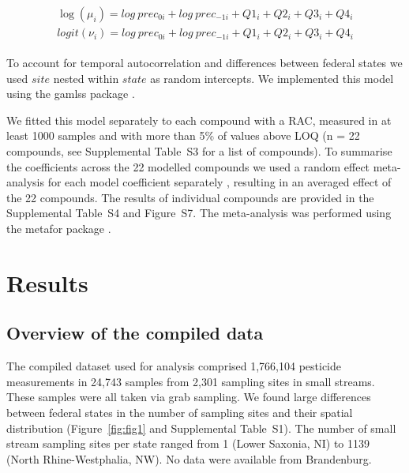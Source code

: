 \documentclass[journal=esthag,manuscript=article]{achemso}
\begin{document}
\begin{align}
\begin{split}
\log(\mu_{i}) = log~prec_{0 i} + log~prec_{-1 i} + Q1_{i} + Q2_{i}+Q3_{i}+Q4_{i}\\
logit(\nu_{i}) = log~prec_{0 i} + log~prec_{-1 i} + Q1_{i} + Q2_{i}+Q3_{i}+Q4_{i}
\end{split}
\label{eqn:eqn4}
\end{align}

To account for temporal autocorrelation and differences between federal states we used $site$ nested within $state$ as random intercepts.
We implemented this model using the gamlss package \cite{stasinopoulos_generalized_2007}. 

We fitted this model separately to each compound with a RAC, measured in at least 1000 samples and with more than 5\% of values above LOQ (n = 22 compounds, see Supplemental Table~S3 for a list of compounds). 
To summarise the coefficients across the 22 modelled compounds we used a random effect meta-analysis for each model coefficient separately \citep{harrison_getting_2011}, resulting in an averaged effect of the 22 compounds.
The results of individual compounds are provided in the Supplemental Table~S4 and Figure~S7.
The meta-analysis was performed using the metafor package \citep{Viechtbauer_2010}. 



\section{Results}
\subsection{Overview of the compiled data}

The compiled dataset used for analysis comprised 1,766,104 pesticide measurements in 24,743 samples from 2,301 sampling sites in small streams.  %
These samples were all taken via grab sampling.  
We found large differences between federal states in the number of sampling sites and their spatial distribution (Figure~\ref{fig:fig1} and Supplemental Table~S1). 
The number of small stream sampling sites per state ranged from 1 (Lower Saxonia, NI) to 1139 (North Rhine-Westphalia, NW).
No data were available from Brandenburg. 
\end{document}
